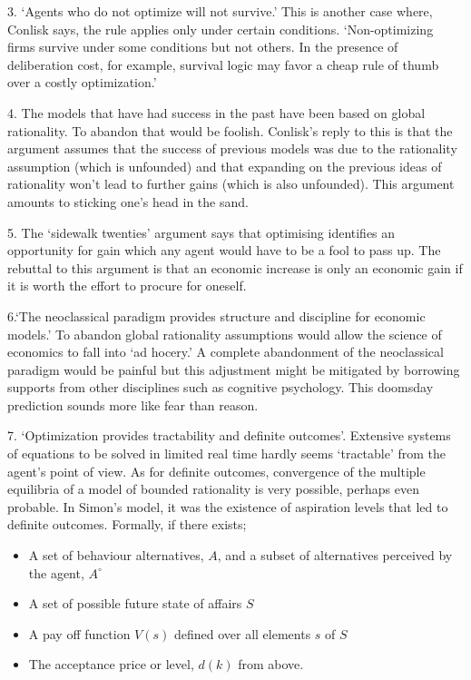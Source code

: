 \documentclass{ucthesis}
\begin{document}
3. `Agents who do not optimize will not survive.' This is another case
where, Conlisk says, the rule applies only under certain conditions.
`Non-optimizing firms survive under some conditions but not others. In the
presence of deliberation cost, for example, survival logic may favor a cheap
rule of thumb over a costly optimization.' \cite[pp.684]{conlisk}

4. The models that have had success in the past have been based on global
rationality. To abandon that would be foolish. Conlisk's reply to this is
that the argument assumes that the success of previous models was due to the
rationality assumption (which is unfounded) and that expanding on the
previous ideas of rationality won't lead to further gains (which is also
unfounded). This argument amounts to sticking one's head in the sand.

5. The `sidewalk twenties' argument says that optimising identifies an
opportunity for gain which any agent would have to be a fool to pass up. The
rebuttal to this argument is that an economic increase is only an economic
gain if it is worth the effort to procure for oneself.

6.`The neoclassical paradigm provides structure and discipline for economic
models.' To abandon global rationality assumptions would allow the science
of economics to fall into `ad hocery.' A complete abandonment of the
neoclassical paradigm would be painful but this adjustment might be
mitigated by borrowing supports from other disciplines such as cognitive
psychology. This doomsday prediction sounds more like fear than reason.

7. `Optimization provides tractability and definite outcomes'. Extensive
systems of equations to be solved in limited real time hardly seems
`tractable' from the agent's point of view. As for definite outcomes,
convergence of the multiple equilibria of a model of bounded rationality is
very possible, perhaps even probable. In Simon's \cite[1955]{Simon BMRC}
model, it was the existence of aspiration levels that led to definite
outcomes. Formally, if there exists;

\begin{itemize}
\item A set of behaviour alternatives, $A$, and a subset of alternatives
perceived by the agent, $A^{\circ }$

\item A set of possible future state of affairs $S$

\item A pay off function $V\left( s\right) $ defined over all elements $s$
of $S$

\item The acceptance price or level, $d\left( k\right) $ from above.
\end{itemize}
\end{document}

